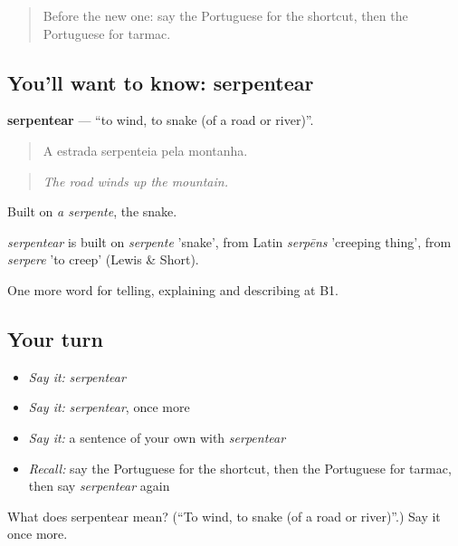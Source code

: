 \label{lesson:PT-C410-serpentear}



\begin{quote}
Before the new one: say the Portuguese for the shortcut, then the Portuguese for tarmac.
\end{quote}

\subsection*{You'll want to know: serpentear}
\textbf{serpentear} — \textquotedblleft{}to wind, to snake (of a road or river)\textquotedblright{}.

\begin{quote}
A estrada serpenteia pela montanha.
\end{quote}

\begin{quote}
\emph{The road winds up the mountain.}
\end{quote}

Built on \emph{a serpente}, the snake.

\begin{cousinweb}
\emph{serpentear} is built on \emph{serpente} 'snake', from Latin \emph{serpēns} 'creeping thing', from \emph{serpere} 'to creep' (Lewis \& Short).
\end{cousinweb}

\begin{grammarlens}[title={What you've built}]
One more word for telling, explaining and describing at B1.
\end{grammarlens}

\subsection*{Your turn}
\begin{itemize}
\raggedright
  \item \emph{Say it:} \emph{serpentear}
  \item \emph{Say it:} \emph{serpentear}, once more
  \item \emph{Say it:} a sentence of your own with \emph{serpentear}
  \item \emph{Recall:} say the Portuguese for the shortcut, then the Portuguese for tarmac, then say \emph{serpentear} again
\end{itemize}

\begin{tcolorbox}[breakable,colback=teal!4,colframe=teal!35!black,title={Before you move on}]
What does serpentear mean? (\textquotedblleft{}To wind, to snake (of a road or river)\textquotedblright{}.) Say it once more.
\end{tcolorbox}

